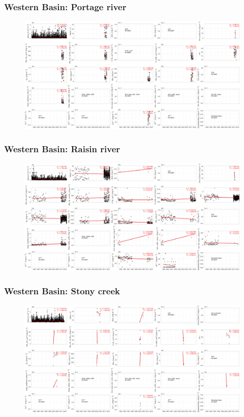 \documentclass{beamer}
\begin{document}
\begin{frame}
\frametitle{Western Basin: Portage river}
\begin{figure}
\includegraphics[width=\textwidth]{rivers/Western basin/plot_all portageriver.png}
\end{figure}
\end{frame}


\begin{frame}
\frametitle{Western Basin: Raisin river}
\begin{figure}
\includegraphics[width=\textwidth]{rivers/Western basin/plot_all riverraisin.png}
\end{figure}
\end{frame}


\begin{frame}
\frametitle{Western Basin: Stony creek}
\begin{figure}
\includegraphics[width=\textwidth]{rivers/Western basin/plot_all stonycreek.png}
\end{figure}
\end{frame}
\end{document}
